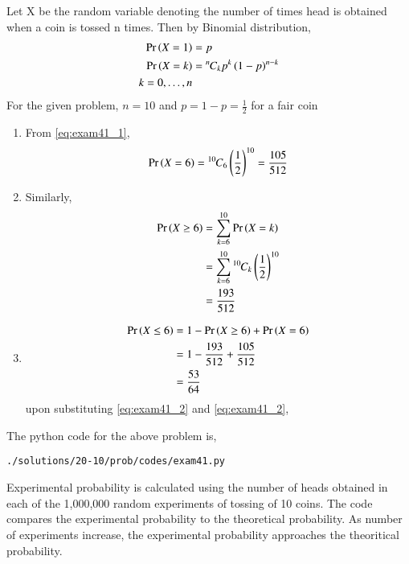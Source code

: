 Let X be the random variable denoting the number of times head is obtained when a coin is tossed n times. Then by Binomial distribution,
\begin{align}
\Pr\left(X = 1\right) &= p
\\
\Pr\left(X = k\right) &= {{}^{n}\mkern-1muC_{k}} p^k \left(1-p\right)^{n-k}
\\
k = 0,\dots, n
\label{eq:exam41_1}
\end{align}
For the given problem, $n = 10$ and $p = 1-p = \frac{1}{2}$ for a fair coin
\begin{enumerate}
\item From \eqref{eq:exam41_1},
\begin{align}
\Pr\left(X = 6\right)= {{}^{10}\mkern-1muC_{6}}\left(\frac{1}{2}\right)^{10}
= \frac{105}{512}
\label{eq:exam41_2}
\end{align}
\item Similarly, 
\begin{align} 
\Pr\left(X \geq 6\right)&=\sum_{k=6}^{10}\Pr\left(X=k\right)
\\
&=\sum_{k=6}^{10}{{}^{10}\mkern-1muC_{k}}\left(\frac{1}{2}\right)^{10}
\\
&= \frac{193}{512}
\label{eq:exam41_3}
\end{align}
\item 
\begin{align}
\Pr\left(X \leq 6\right)&= 1 - \Pr\left(X \geq 6\right) + \Pr\left(X=6\right)
\\
&= 1 - \frac{193}{512} +  \frac{105}{512} 
\\
&=\frac{53}{64}
\end{align}
upon substituting \eqref{eq:exam41_2} and \eqref{eq:exam41_2}, 
\end{enumerate}
The python code for the above problem is,
\begin{lstlisting}
./solutions/20-10/prob/codes/exam41.py
\end{lstlisting}
Experimental probability is calculated using the number of heads obtained in each of the 1,000,000 random experiments of tossing of 10 coins.
The code compares the experimental probability to the theoretical probability. As number of experiments increase, the experimental probability approaches the theoritical probability.
